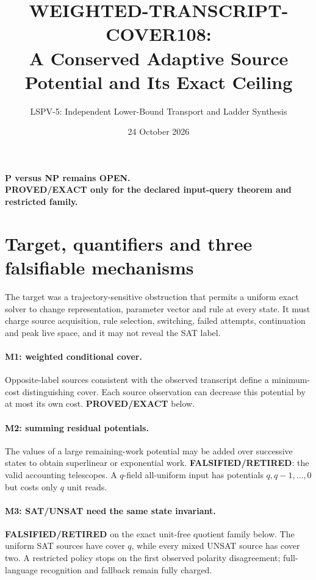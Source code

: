 \documentclass[11pt]{article}
\title{WEIGHTED-TRANSCRIPT-COVER108:\\A Conserved Adaptive Source Potential and Its Exact Ceiling}
\author{LSPV-5: Independent Lower-Bound Transport and Ladder Synthesis}
\date{24 October 2026}
\begin{document}
\maketitle
\begin{center}
\textbf{P versus NP remains OPEN.}\\
\textbf{PROVED/EXACT only for the declared input-query theorem and restricted family.}
\end{center}

\section{Target, quantifiers and three falsifiable mechanisms}
The target was a trajectory-sensitive obstruction that permits a uniform exact
solver to change representation, parameter vector and rule at every state.  It
must charge source acquisition, rule selection, switching, failed attempts,
continuation and peak live space, and it may not reveal the SAT label.

\paragraph{M1: weighted conditional cover.}
Opposite-label sources consistent with the observed transcript define a
minimum-cost distinguishing cover.  Each source observation can decrease this
potential by at most its own cost.  \textbf{PROVED/EXACT} below.

\paragraph{M2: summing residual potentials.}
The values of a large remaining-work potential may be added over successive
states to obtain superlinear or exponential work.  \textbf{FALSIFIED/RETIRED}:
the valid accounting telescopes.  A $q$-field all-uniform input has potentials
$q,q-1,\ldots,0$ but costs only $q$ unit reads.

\paragraph{M3: SAT/UNSAT need the same state invariant.}
\textbf{FALSIFIED/RETIRED} on the exact unit-free quotient family below.  The
uniform SAT sources have cover $q$, while every mixed UNSAT source has cover
two.  A restricted policy stops on the first observed polarity disagreement;
full-language recognition and fallback remain fully charged.
\end{document}
